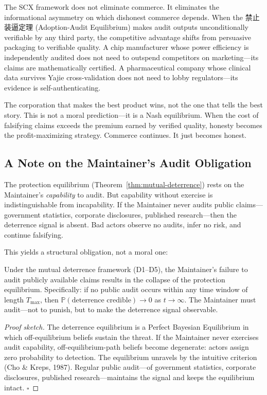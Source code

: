 \documentclass[12pt,a4paper]{ctexart}
\theoremstyle{definition}
\theoremstyle{remark}
\begin{document}
The SCX framework does not eliminate commerce. It eliminates the informational asymmetry on which dishonest commerce depends. When the 禁止装逼定理 (Adoption-Audit Equilibrium) makes audit outputs unconditionally verifiable by any third party, the competitive advantage shifts from persuasive packaging to verifiable quality. A chip manufacturer whose power efficiency is independently audited does not need to outspend competitors on marketing—its claims are mathematically certified. A pharmaceutical company whose clinical data survives Yajie cross-validation does not need to lobby regulators—its evidence is self-authenticating.

The corporation that makes the best product wins, not the one that tells the best story. This is not a moral prediction—it is a Nash equilibrium. When the cost of falsifying claims exceeds the premium earned by verified quality, honesty becomes the profit-maximizing strategy. Commerce continues. It just becomes honest.

\subsection{A Note on the Maintainer's Audit Obligation}

The protection equilibrium (Theorem~\ref{thm:mutual-deterrence}) rests on the Maintainer's \textit{capability} to audit. But capability without exercise is indistinguishable from incapability. If the Maintainer never audits public claims—government statistics, corporate disclosures, published research—then the deterrence signal is absent. Bad actors observe no audits, infer no risk, and continue falsifying.

This yields a structural obligation, not a moral one:

\begin{corollary}
\label{cor:audit-obligation}
Under the mutual deterrence framework (D1--D5), the Maintainer's failure to audit publicly available claims results in the collapse of the protection equilibrium. Specifically: if no public audit occurs within any time window of length $T_{\max}$, then $\mathbb{P}(\text{deterrence credible}) \to 0$ as $t \to \infty$. The Maintainer must audit—not to punish, but to make the deterrence signal observable.
\end{corollary}

\begin{proof}[Proof sketch]
The deterrence equilibrium is a Perfect Bayesian Equilibrium in which off-equilibrium beliefs sustain the threat. If the Maintainer never exercises audit capability, off-equilibrium-path beliefs become degenerate: actors assign zero probability to detection. The equilibrium unravels by the intuitive criterion (Cho \& Kreps, 1987). Regular public audit—of government statistics, corporate disclosures, published research—maintains the signal and keeps the equilibrium intact. $\square$
\end{proof}
\end{document}
